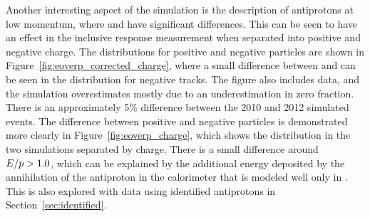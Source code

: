 Another interesting aspect of the simulation is the description of antiprotons at low momentum, where \QGSP and \FTFP have significant differences.
This can be seen to have an effect in the inclusive response measurement when separated into positive and negative charge.
The \epcor distributions for positive and negative particles are shown in Figure~\ref{fig:eoverp_corrected_charge}, where a small difference between \QGSP and \FTFP can be seen in the distribution for negative tracks.
The figure also includes data, and the simulation overestimates \epcor mostly due to an underestimation in zero fraction.
There is an approximately 5\% difference between the 2010 and 2012 simulated events.
The difference between positive and negative particles is demonstrated more clearly in Figure~\ref{fig:eoverp_charge}, which shows the \ep distribution in the two simulations separated by charge.
There is a small difference around $E/p > 1.0$, which can be explained by the additional energy deposited by the annihilation of the antiproton in the calorimeter that is modeled well only in \FTFP.
This is also explored with data using identified antiprotons in Section~\ref{sec:identified}. 

